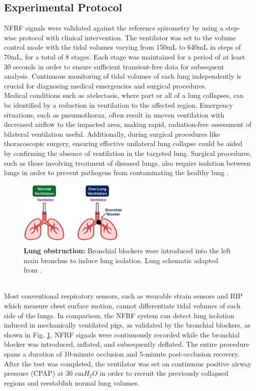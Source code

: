 \documentclass[journal]{IEEEtran}
\begin{document}
\subsection{Experimental Protocol}
NFRF signals were validated against the reference spirometry by using a step-wise protocol with clinical intervention. The ventilator was set to the volume control mode with the tidal volumes varying from 150mL to 640mL in steps of 70mL, for a total of 8 stages. Each stage was maintained for a period of at least 30 seconds in order to ensure sufficient transient-free data for subsequent analysis. Continuous monitoring of tidal volumes of each lung independently is crucial for diagnosing medical emergencies and surgical procedures. \\
Medical conditions such as atelectasis, where part or all of a lung collapses, can be identified by a reduction in ventilation to the affected region. Emergency situations, such as pneumothorax, often result in uneven ventilation with decreased airflow to the impacted area, making rapid, radiation-free assessment of bilateral ventilation useful. Additionally, during surgical procedures like thoracoscopic surgery, ensuring effective unilateral lung collapse could be aided by confirming the absence of ventilation in the targeted lung. Surgical procedures, such as those involving treatment of diseased lungs, also require isolation between lungs in order to prevent pathogens from contaminating the healthy lung \cite{smithLungIsolationAnesthesia2024}. 
\begin{figure}[htpb]
\centering
\includegraphics[width=0.48\textwidth]{occlusion.jpg}
\caption{\textbf{Lung obstruction:} Bronchial blockers were introduced into the left main bronchus to induce lung isolation. Lung schematic adapted from \cite{lungImage}.}
\label{fig:occlusion}
\end{figure}\\
Most conventional respiratory sensors, such as wearable strain sensors and RIP which measure chest surface motion, cannot differentiate tidal volumes of each side of the lungs. In comparison, the NFRF system can detect lung isolation induced in mechanically ventilated pigs, as validated by the bronchial blockers, as shown in Fig. \ref{fig:occlusion}. NFRF signals were continuously recorded while the bronchial blocker was introduced, inflated, and subsequently deflated. The entire procedure spans a duration of 10-minute occlusion and 5-minute post-occlusion recovery. After the test was completed, the ventilator was set on continuous positive airway pressure (CPAP) at 30 cm$H_{2}O$ in order to recruit the previously collapsed regions and reestablish normal lung volumes.  
\end{document}
